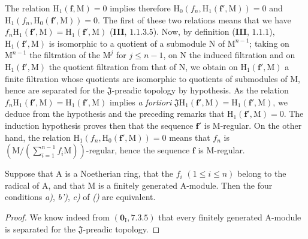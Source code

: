 The relation $\mathrm{H}_1(\mathbf{f},\mathrm{M})=0$ implies therefore $\mathrm{H}_0(f_n,\mathrm{H}_1(\mathbf{f}',\mathrm{M}))=0$ and $\mathrm{H}_1(f_n,\mathrm{H}_0(\mathbf{f}',\mathrm{M}))=0$.
The first of these two relations means that we have $f_n\mathrm{H}_1(\mathbf{f}',\mathrm{M})=\mathrm{H}_1(\mathbf{f}',\mathrm{M})$ \quad (\textbf{III},
$1.1.3.5$). Now, by definition (\textbf{III}, $1.1.1$), $\mathrm{H}_1(\mathbf{f}',\mathrm{M})$ is isomorphic to a quotient of a submodule $\mathrm{N}$ of $\mathrm{M}^{n-1}$; taking on $\mathrm{M}^{n-1}$ the filtration of the $\mathrm{M}^j$ for $j\leqslant n-1$, on $\mathrm{N}$ the induced filtration and on $\mathrm{H}_1(\mathbf{f}',\mathrm{M})$ the quotient filtration from that of $\mathrm{N}$, we obtain on $\mathrm{H}_1(\mathbf{f}',\mathrm{M})$ a finite filtration whose quotients are isomorphic to quotients of submodules of $\mathrm{M}$, hence are separated for the $\mathfrak{J}$-preadic topology by hypothesis.
As the relation $f_n\mathrm{H}_1(\mathbf{f}',\mathrm{M})=\mathrm{H}_1(\mathbf{f}',\mathrm{M})$ implies \emph{a fortiori} $\mathfrak{J}\mathrm{H}_1(\mathbf{f}',\mathrm{M})=\mathrm{H}_1(\mathbf{f}',\mathrm{M})$,
we deduce from the hypothesis and the preceding remarks that $\mathrm{H}_1(\mathbf{f}',\mathrm{M})=0$. The induction hypothesis proves then that the sequence $\mathbf{f}'$ is M-regular. On the other hand, the relation
$\mathrm{H}_1(f_n,\mathrm{H}_0(\mathbf{f}',\mathrm{M}))=0$ means that $f_n$ is $(\mathrm{M}/(\sum_{i=1}^{n-1}f_i\mathrm{M}))$-regular, hence the sequence $\mathbf{f}$ is M-regular.

\begin{corollary}[19.5.2]
\label{IV.19.5.2}
Suppose that $\mathrm{A}$ is a Noetherian ring, that the $f_i$ $(1\leqslant i\leqslant n)$ belong to the radical of $\mathrm{A}$, and that $\mathrm{M}$ is a finitely generated $\mathrm{A}$-module. Then the four conditions \emph{a)}, \emph{b')}, \emph{c)} of \emph{()} are equivalent.
\end{corollary}

\begin{proof}
We know indeed from $(\mathbf{0}_\mathrm{I},7.3.5)$ that every finitely generated $\mathrm{A}$-module is separated for the $\mathfrak{J}$-preadic topology.
\end{proof}


